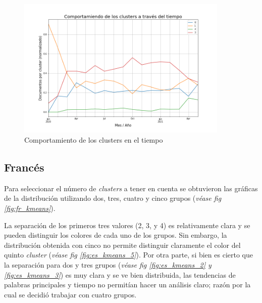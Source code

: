 \begin{figure}
    \centering
    \includegraphics[width=0.9\textwidth]{results/TopicDetection/es/cluster_over_time.png}
    \caption{Comportamiento de los clusters en el tiempo}
    \label{fig:es_time}
\end{figure}

\subsection{Francés}
Para seleccionar el número de \textit{clusters} a tener en cuenta se obtuvieron las gráficas de la distribución utilizando dos, tres, cuatro y cinco grupos (\textit{véase fig \ref{fig:fr_kmeans}}).

La separación de los primeros tres valores (2, 3, y 4) es relativamente clara y se pueden distinguir los colores de cada uno de los grupos. Sin embargo, la distribución obtenida con cinco no permite distinguir claramente el color del quinto \textit{cluster} (\textit{véase fig \ref{fig:es_kmeans_5}}). Por otra parte, si bien es cierto que la separación para dos y tres grupos (\textit{véase fig \ref{fig:es_kmeans_2} y \ref{fig:es_kmeans_3}}) es muy clara y se ve bien distribuida, las tendencias de palabras principales y tiempo no permitían hacer un análisis claro; razón por la cual se decidió trabajar con cuatro grupos.\\

